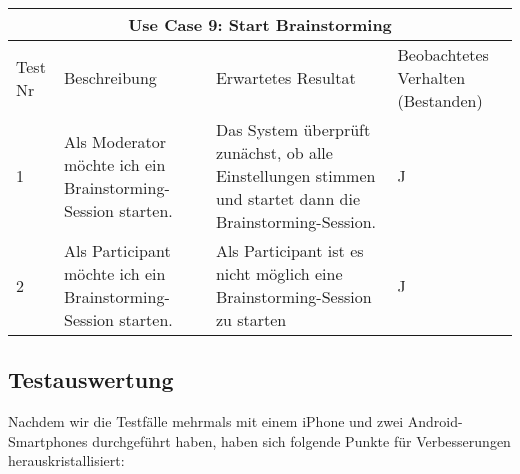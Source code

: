 \renewcommand{\arraystretch}{1.35}
\begin{center}
	\begin{longtable}{| p{1cm} | p{4cm} | p{5cm} | p{3cm} |}
		\hline
		\multicolumn{4}{|c|}{\textbf{Use Case 9: Start Brainstorming}}\\
		\hline\hline
		Test Nr & Beschreibung & Erwartetes Resultat & Beo\-bach\-te\-tes Verhalten (Bestanden) \\
		\hline
		1 & Als Moderator möchte ich ein Brainstorming-Session starten. & Das System überprüft zunächst, ob alle Einstellungen stimmen und startet dann die Brainstorming-Session. & J \\
		\hline
		2 & Als Participant möchte ich ein Brainstorming-Session starten. & Als Participant ist es nicht möglich eine Brainstorming-Session zu starten & J\\
		\hline
	\end{longtable}
\end{center}

\subsection{Testauswertung}
Nachdem wir die Testfälle mehrmals mit einem iPhone und zwei Android-Smartphones durchgeführt haben, haben sich folgende Punkte für Verbesserungen herauskristallisiert:


